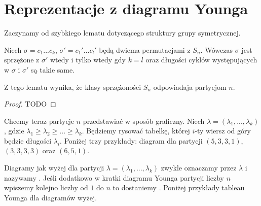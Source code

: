
\section{Reprezentacje z diagramu Younga}

Zaczynamy od szybkiego lematu dotyczącego struktury grupy symetrycznej.

\begin{lemma}{}{}
  Niech $\sigma=c_1...c_k$, $\sigma'=c_1'...c_l'$ będą dwiema permutacjami z $S_n$. Wówczas $\sigma$ jest sprzężone z $\sigma'$ wtedy i tylko wtedy gdy $k=l$ oraz długości cyklów występujących w $\sigma$ i $\sigma'$ są takie same.
\end{lemma}

Z tego lematu wynika, że klasy sprzężoności $S_n$ odpowiadaja partycjom $n$.

\begin{proof}
  \color{red}TODO
\end{proof}

Chcemy teraz partycje $n$ przedstawiać w sposób graficzny. Niech $\lambda=(\lambda_1,...,\lambda_k)$, gdzie $\lambda_1\geq \lambda_2\geq...\geq\lambda_k$. Będziemy rysować tabelkę, której $i$-ty wiersz od góry będzie długości $\lambda_i$. Poniżej trzy przykłady: diagram dla partycji $(5, 3, 3, 1)$, $(3, 3, 3, 3)$ oraz $(6, 5, 1)$.

\begin{center}
\end{center}

Diagramy jak wyżej dla partycji $\lambda=(\lambda_1,...,\lambda_k)$ zwykle oznaczamy przez $\lambda$ i nazywamy . Jeśli dodatkowo w kratki diagramu Younga partycji liczby $n$ wpiszemy kolejno liczby od $1$ do $n$ to dostaniemy . Poniżej przykłady tableau Younga dla diagramów wyżej.

